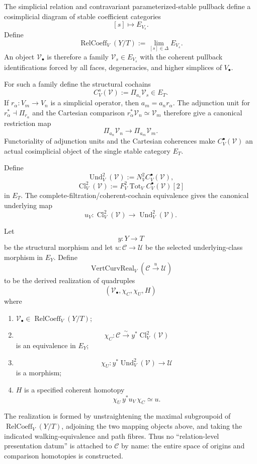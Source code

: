 \begin{construction}
\label{constr:prequantum-relation-level-coefficient-category}
The simplicial relation and contravariant parameterized-stable pullback define a
cosimplicial diagram of stable coefficient categories
\[
[s]\longmapsto E_{V_s}.
\]
Define
\[
\operatorname{RelCoeff}_V(Y/T)
:=
\lim_{[s]\in\Delta}E_{V_s}.
\]
An object $\mathcal V_\bullet$ is therefore a family
$\mathcal V_s\in E_{V_s}$ with the coherent pullback identifications forced by
all faces, degeneracies, and higher simplices of $V_\bullet$.

For such a family define the structural cochains
\[
\boxed{
C_V^s(\mathcal V)
:=
\Pi_{a_s}\mathcal V_s\in E_T.
}
\]
If $r_\alpha:V_m\to V_n$ is a simplicial operator, then
$a_m=a_nr_\alpha$.  The adjunction unit for
$r_\alpha^*\dashv\Pi_{r_\alpha}$ and the Cartesian comparison
$r_\alpha^*\mathcal V_n\simeq\mathcal V_m$ therefore give a canonical
restriction map
\[
\Pi_{a_n}\mathcal V_n
\longrightarrow
\Pi_{a_m}\mathcal V_m.
\]
Functoriality of adjunction units and the Cartesian coherences make
$C_V^\bullet(\mathcal V)$ an actual cosimplicial object of the single stable
category $E_T$.

Define
\[
\operatorname{Und}_V^2(\mathcal V)
:=
N_V^2C_V^\bullet(\mathcal V),
\]
\[
\operatorname{Cl}_V^2(\mathcal V)
:=
F_V^2\operatorname{Tot}_VC_V^\bullet(\mathcal V)[2]
\]
in $E_T$.  The complete-filtration/coherent-cochain equivalence gives the
canonical underlying map
\[
 u_V:
\operatorname{Cl}_V^2(\mathcal V)
\longrightarrow
\operatorname{Und}_V^2(\mathcal V).
\]
\end{construction}

\begin{definition}
\label{def:prequantum-vertical-origin-realization}
Let
\[
y:Y\longrightarrow T
\]
be the structural morphism and let $u:\mathscr C\to\mathscr U$ be the selected
underlying-class morphism in $E_Y$.  Define
\[
\boxed{
\operatorname{VertCurvReal}_V(\mathscr C\xrightarrow{u}\mathscr U)
}
\]
to be the derived realization of quadruples
\[
(\mathcal V_\bullet,\chi_C,\chi_U,H)
\]
where
\begin{enumerate}
\item $\mathcal V_\bullet\in\operatorname{RelCoeff}_V(Y/T)$;
\item
\[
\chi_C:\mathscr C\xrightarrow{\sim}
y^*\operatorname{Cl}_V^2(\mathcal V)
\]
is an equivalence in $E_Y$;
\item
\[
\chi_U:y^*\operatorname{Und}_V^2(\mathcal V)\longrightarrow\mathscr U
\]
is a morphism;
\item $H$ is a specified coherent homotopy
\[
\chi_U\,y^*u_V\,\chi_C\simeq u.
\]
\end{enumerate}
The realization is formed by unstraightening the maximal subgroupoid of
$\operatorname{RelCoeff}_V(Y/T)$, adjoining the two mapping objects above, and
taking the indicated walking-equivalence and path fibres.  Thus no
``relation-level presentation datum'' is attached to $\mathscr C$ by name: the
entire space of origins and comparison homotopies is constructed.
\end{definition}

